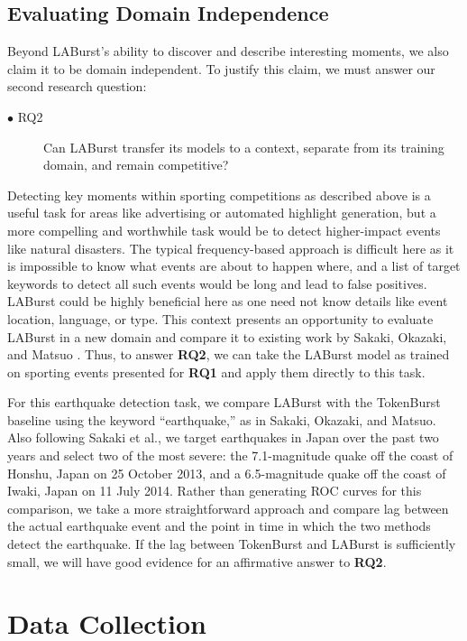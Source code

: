 \documentclass[letterpaper]{article}
\begin{document}
\subsection{Evaluating Domain Independence}

Beyond LABurst's ability to discover and describe interesting moments, we also claim it to be domain independent.
To justify this claim, we must answer our second research question:
\begin{description}
\item[$\bullet$ RQ2] Can LABurst transfer its models to a context, separate from its training domain, and remain competitive?
\end{description}

Detecting key moments within sporting competitions as described above is a useful task for areas like advertising or automated highlight generation, but a more compelling and worthwhile task would be to detect higher-impact events like natural disasters.
The typical frequency-based approach is difficult here as it is impossible to know what events are about to happen where, and a list of target keywords to detect all such events would be long and lead to false positives.
LABurst could be highly beneficial here as one need not know details like event location, language, or type.
This context presents an opportunity to evaluate LABurst in a new domain and compare it to existing work by Sakaki, Okazaki, and Matsuo \cite{Sakaki:2010:EST:1772690.1772777}.
Thus, to answer \textbf{RQ2}, we can take the LABurst model as trained on sporting events presented for \textbf{RQ1} and apply them directly to this task.

For this earthquake detection task, we compare LABurst with the TokenBurst baseline using the keyword ``earthquake,'' as in Sakaki, Okazaki, and Matsuo.
Also following Sakaki et al., we target earthquakes in Japan over the past two years and select two of the most severe: the 7.1-magnitude quake off the coast of Honshu, Japan on 25 October 2013, and a 6.5-magnitude quake off the coast of Iwaki, Japan on 11 July 2014.
Rather than generating ROC curves for this comparison, we take a more straightforward approach and compare lag between the actual earthquake event and the point in time in which the two methods detect the earthquake.
If the lag between TokenBurst and LABurst is sufficiently small, we will have good evidence for an affirmative answer to \textbf{RQ2}.

\section{Data Collection}
\end{document}
